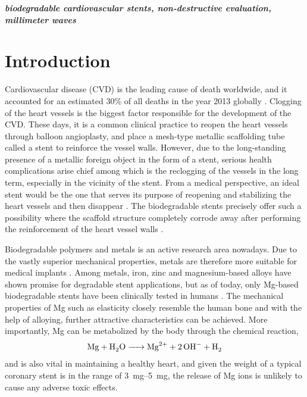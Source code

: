 \documentclass[conference,a4paper]{IEEEtran}
\begin{document}
\textbf{\small{\emph{biodegradable cardiovascular stents, non-destructive evaluation, millimeter waves}}}


%
\IEEEpeerreviewmaketitle

\vspace{7pt}
\section{Introduction}
Cardiovascular disease (CVD) is the leading cause of death worldwide, and it accounted for an estimated 30\% of all deaths in the year 2013 globally \cite{benjamin_heart_2017}. Clogging of the heart vessels is the biggest factor responsible for the development of the CVD. These days, it is a common clinical practice to reopen the heart vessels through balloon angioplasty, and place a mesh-type metallic scaffolding tube called a stent to reinforce the vessel walls.  However, due to the long-standing presence of a metallic foreign object in the form of a stent, serious health complications arise chief among which is the reclogging of the vessels in the long term, especially in the vicinity of the stent. From a medical perspective, an ideal stent would be the one that serves its purpose of reopening and stabilizing the heart vessels and then disappear \cite{waksman_biodegradable_2006}.  The biodegradable stents  precisely offer such a possibility where the scaffold structure completely corrode away after performing the reinforcement of the heart vessel walls \cite{hou_review_2016}.

Biodegradable polymers and metals is an active research area nowadays. Due to the vastly superior mechanical properties, metals are therefore more suitable for medical implants \cite{chen_recent_2014}. Among metals, iron, zinc and magnesium-based alloys have shown promise for degradable stent applications, but as of today, only Mg-based biodegradable stents have been clinically tested in humans \cite{staiger_magnesium_2006,esmaily_fundamentals_2017}. The mechanical properties of Mg such as elasticity closely resemble the human bone \cite{hermawan2018updates} and with the help of alloying, further attractive characteristics can be achieved. More importantly, Mg can be metabolized by the body through the chemical reaction,
%
\begin{align} \notag
  \ce{Mg + H_2O -> Mg^{2+} + 2OH^{-} + H2}
\end{align}
%
and is also vital in maintaining a healthy heart, and given the weight of a typical
coronary stent is in the range of \SIrange{3}{5}{\mg}, the release of Mg ions is unlikely to cause any adverse toxic effects.
\end{document}
